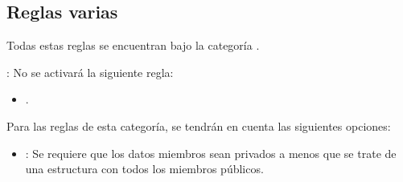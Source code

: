 \subsection{Reglas varias}

Todas estas reglas se encuentran bajo la categoría .

: No se activará la siguiente regla:
\begin{itemize}

\item {}.

\end{itemize}

Para las reglas de esta categoría, se tendrán en cuenta las siguientes
opciones:

\begin{itemize}

\item {}:
Se requiere que los datos miembros sean privados a menos que se trate de
una estructura con todos los miembros públicos.

\end{itemize}
